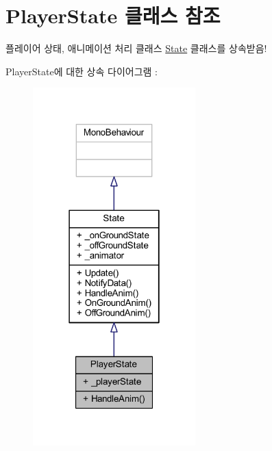 \hypertarget{class_player_state}{}\section{Player\+State 클래스 참조}
\label{class_player_state}


플레이어 상태, 애니메이션 처리 클래스 \mbox{\hyperlink{class_state}{State}} 클래스를 상속받음!  




Player\+State에 대한 상속 다이어그램 \+: 
\nopagebreak
\begin{figure}[H]
\begin{center}
\leavevmode
\includegraphics[width=178pt]{d1/dd1/class_player_state__inherit__graph}
\end{center}
\end{figure}


